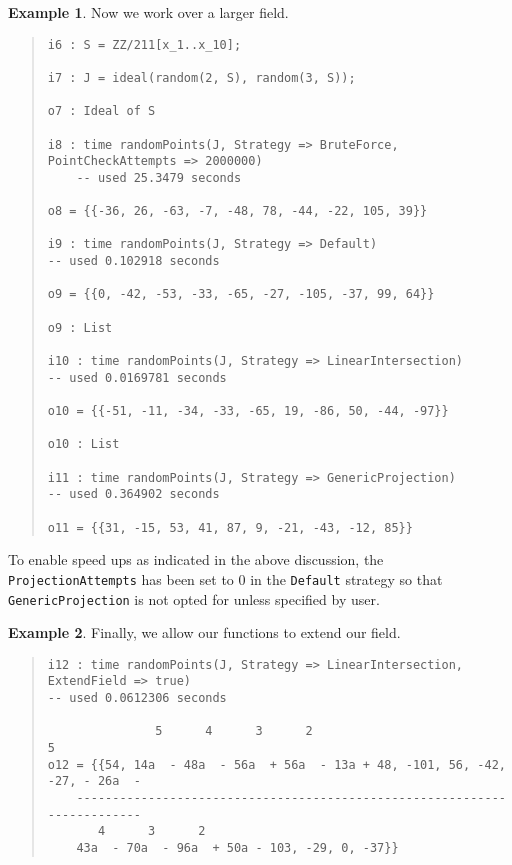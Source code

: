 \documentclass[11pt]{amsart}
\theoremstyle{definition}
\newtheorem{example}{Example}[section]
\begin{document}
\begin{example}
    Now we work over a larger field.
    {{\small\color{blue}
    \begin{quote}
\begin{verbatim}
i6 : S = ZZ/211[x_1..x_10];

i7 : J = ideal(random(2, S), random(3, S));

o7 : Ideal of S

i8 : time randomPoints(J, Strategy => BruteForce, PointCheckAttempts => 2000000)
    -- used 25.3479 seconds
    
o8 = {{-36, 26, -63, -7, -48, 78, -44, -22, 105, 39}}

i9 : time randomPoints(J, Strategy => Default)
-- used 0.102918 seconds

o9 = {{0, -42, -53, -33, -65, -27, -105, -37, 99, 64}}

o9 : List

i10 : time randomPoints(J, Strategy => LinearIntersection)
-- used 0.0169781 seconds

o10 = {{-51, -11, -34, -33, -65, 19, -86, 50, -44, -97}}

o10 : List

i11 : time randomPoints(J, Strategy => GenericProjection)
-- used 0.364902 seconds

o11 = {{31, -15, 53, 41, 87, 9, -21, -43, -12, 85}}      
    \end{verbatim}
\end{quote}\vspace{-2em}
        }}
    \end{example}
To enable speed ups as indicated in the above discussion, the {\tt ProjectionAttempts} has been set to $0$ in the {\tt Default} strategy so that {\tt GenericProjection} is not opted for unless specified by user.
\begin{example}
        Finally, we allow our functions to extend our field.
        {{\small\color{blue}
        \begin{quote}
        \begin{verbatim}
i12 : time randomPoints(J, Strategy => LinearIntersection, ExtendField => true)
-- used 0.0612306 seconds

               5      4      3      2                                      5  
o12 = {{54, 14a  - 48a  - 56a  + 56a  - 13a + 48, -101, 56, -42, -27, - 26a  -
    -------------------------------------------------------------------------
       4      3      2
    43a  - 70a  - 96a  + 50a - 103, -29, 0, -37}}
        \end{verbatim}
    \end{quote}
        }}
    \end{example}
\end{document}
